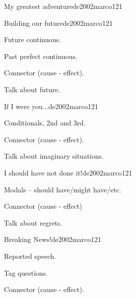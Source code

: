 \begin{syllabus}
\begin{unit}{My greatest adventure}{de2002marco}{12}{1}
\end{unit}

\begin{unit}{Building our future}{de2002marco}{12}{1}
   \begin{topics}
      \item Future continuous.
      \item Past perfect continuous.
      \item Connector (cause - effect).
   \end{topics}

   \begin{learningoutcomes}
      \item Talk about future.
   \end{learningoutcomes}

\end{unit}

\begin{unit}{If I were you...}{de2002marco}{12}{1}
   \begin{topics}
      \item Conditionals, 2nd and 3rd.
      \item Connector (cause - effect).
   \end{topics}

   \begin{learningoutcomes}
      \item Talk about imaginary situations. 
   \end{learningoutcomes}

\end{unit}

\begin{unit}{I should have not done it!}{de2002marco}{12}{1}
   \begin{topics}
      \item Modals – should have/might have/etc.
      \item Connector (cause - effect)
   \end{topics}

   \begin{learningoutcomes}
      \item Talk about regrets.
   \end{learningoutcomes}

\end{unit}

\begin{unit}{Breaking News!}{de2002marco}{12}{1}
   \begin{topics}
      \item Reported speech.
      \item Tag questions.
      \item Connector (cause - effect).
   \end{topics}


\end{unit}
\end{syllabus}
